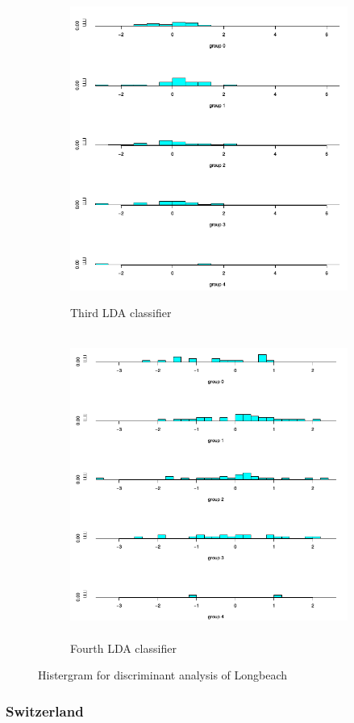 \documentclass[a4paper]{article}
\begin{document}
\begin{figure}[H]
	\begin{subfigure}{0.5\textwidth}
		\caption{Third LDA classifier}
		\includegraphics[width=0.9\linewidth, height=10cm]{Q4_pics/Long-Hist3.png}
	\end{subfigure}
	\begin{subfigure}{0.5\textwidth}
		\caption{Fourth LDA classifier}
		\includegraphics[width=0.9\linewidth, height=10cm]{Q4_pics/Long-Hist4.png}
	\end{subfigure}
	\caption{Histergram for discriminant analysis of Longbeach}
	\label{q4_long_historgrams}
\end{figure}

\newpage
\subsubsection{Switzerland}
\end{document}
